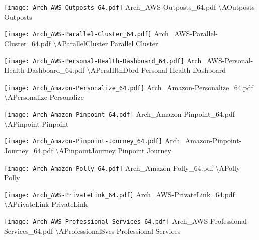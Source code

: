  {\texttt{[image: Arch\_AWS-Outposts\_64.pdf]}} {Arch\_AWS-Outposts\_64.pdf} {{\textbackslash}AOutposts} {Outposts}

 {\texttt{[image: Arch\_AWS-Parallel-Cluster\_64.pdf]}} {Arch\_AWS-Parallel-Cluster\_64.pdf} {{\textbackslash}AParallelCluster} {Parallel Cluster}

 {\texttt{[image: Arch\_AWS-Personal-Health-Dashboard\_64.pdf]}} {Arch\_AWS-Personal-Health-Dashboard\_64.pdf} {{\textbackslash}APersHlthDbrd} {Personal Health Dashboard}

 {\texttt{[image: Arch\_Amazon-Personalize\_64.pdf]}} {Arch\_Amazon-Personalize\_64.pdf} {{\textbackslash}APersonalize} {Personalize}

 {\texttt{[image: Arch\_Amazon-Pinpoint\_64.pdf]}} {Arch\_Amazon-Pinpoint\_64.pdf} {{\textbackslash}APinpoint} {Pinpoint}

 {\texttt{[image: Arch\_Amazon-Pinpoint-Journey\_64.pdf]}} {Arch\_Amazon-Pinpoint-Journey\_64.pdf} {{\textbackslash}APinpointJourney} {Pinpoint Journey}

 {\texttt{[image: Arch\_Amazon-Polly\_64.pdf]}} {Arch\_Amazon-Polly\_64.pdf} {{\textbackslash}APolly} {Polly}

 {\texttt{[image: Arch\_AWS-PrivateLink\_64.pdf]}} {Arch\_AWS-PrivateLink\_64.pdf} {{\textbackslash}APrivateLink} {PrivateLink}

 {\texttt{[image: Arch\_AWS-Professional-Services\_64.pdf]}} {Arch\_AWS-Professional-Services\_64.pdf} {{\textbackslash}AProfessionalSvcs} {Professional Services}

